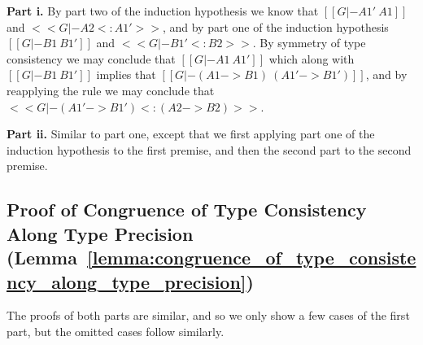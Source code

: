 \begin{itemize}
    \noindent
    \textbf{Part i.} By part two of the induction hypothesis we know
    that $[[G |- A1' ~ A1]]$ and $<<G |- A2 <: A1'>>$, and by part one of the induction hypothesis
    $[[G |- B1 ~ B1']]$ and $<<G |- B1' <: B2>>$.  By symmetry of type consistency
    we may conclude that $[[G |- A1 ~ A1']]$ which along with $[[G |- B1 ~ B1']]$
    implies that $[[G |- (A1 -> B1) ~ (A1' -> B1')]]$, and by reapplying the rule
    we may conclude that $<<G |- (A1' -> B1') <: (A2 -> B2)>>$.

    \noindent
    \textbf{Part ii.} Similar to part one, except that we first
    applying part one of the induction hypothesis to the first
    premise, and then the second part to the second premise.
    
  \end{itemize}


\subsection{Proof of Congruence of Type Consistency Along Type Precision (Lemma~\ref{lemma:congruence_of_type_consistency_along_type_precision})}
\label{subsec:proof_of_congruence_of_type_consistency_along_type_precision_lemma:congruence_of_type_consistency_along_type_precision}
The proofs of both parts are similar, and so we only show a few
  cases of the first part, but the omitted cases follow similarly.

